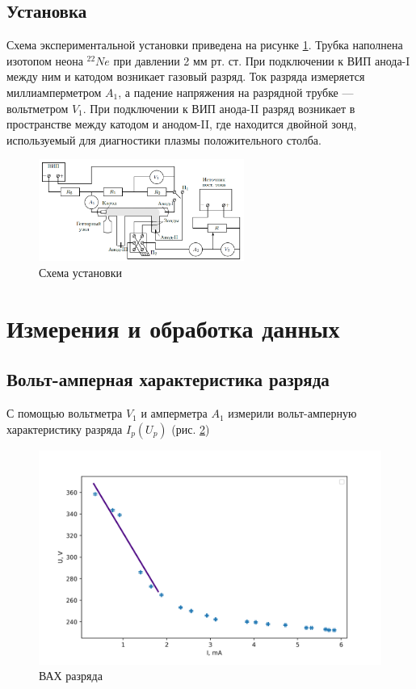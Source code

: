 \documentclass[a4paper,12pt]{article} %
\begin{document}
\subsection{Установка}
Схема экспериментальной установки приведена на рисунке \ref{установка}. Трубка наполнена изотопом неона $^{22}Ne$ при давлении 2 мм рт. ст. При подключении к ВИП анода-I между ним и катодом возникает газовый разряд. Ток разряда измеряется миллиамперметром $A_1$, а падение
напряжения на разрядной трубке — вольтметром $V_1$. При подключении к ВИП анода-II разряд возникает в пространстве между катодом и анодом-II, где находится двойной зонд, используемый
для диагностики плазмы положительного столба.
\begin{figure}[h!]
\begin{center}
\includegraphics[width=0.6\textwidth]{Установка}
\caption{Схема установки} \label{установка}
\end{center}
\end{figure}

\section{Измерения и обработка данных}
\subsection{Вольт-амперная характеристика разряда}
С помощью вольтметра $V_1$ и амперметра $A_1$ измерили вольт-амперную
характеристику разряда $I_p(U_p)$ (рис. \ref{ВАХ_разряда})

\begin{figure}[h!]
\begin{center}
\includegraphics[width=\textwidth]{U(I)_discharge}
\caption{ВАХ разряда} \label{ВАХ_разряда}
\end{center}
\end{figure}
\end{document}
